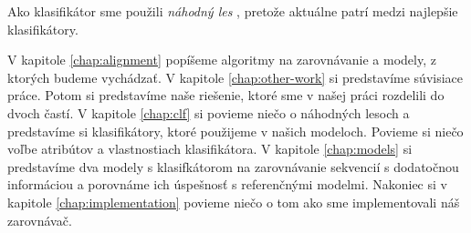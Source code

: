 

Ako klasifikátor sme použili \emph{náhodný les} \cite{randomForestPaper}, pretože aktuálne patrí medzi najlepšie klasifikátory.


V kapitole \ref{chap:alignment} popíšeme algoritmy na zarovnávanie a modely, z ktorých budeme vychádzať. V kapitole \ref{chap:other-work} si predstavíme súvisiace práce. Potom si predstavíme naše riešenie, ktoré sme v našej práci rozdelili do dvoch častí. V kapitole \ref{chap:clf} si povieme niečo o náhodných lesoch a predstavíme si klasifikátory, ktoré použijeme v našich modeloch. Povieme si niečo voľbe atribútov a vlastnostiach klasifikátora. V kapitole \ref{chap:models} si predstavíme dva modely s klasifkátorom na zarovnávanie sekvencií s dodatočnou informáciou a porovnáme ich úspešnosť s referenčnými modelmi. Nakoniec si v kapitole \ref{chap:implementation} povieme niečo o tom ako sme implementovali náš zarovnávač.
